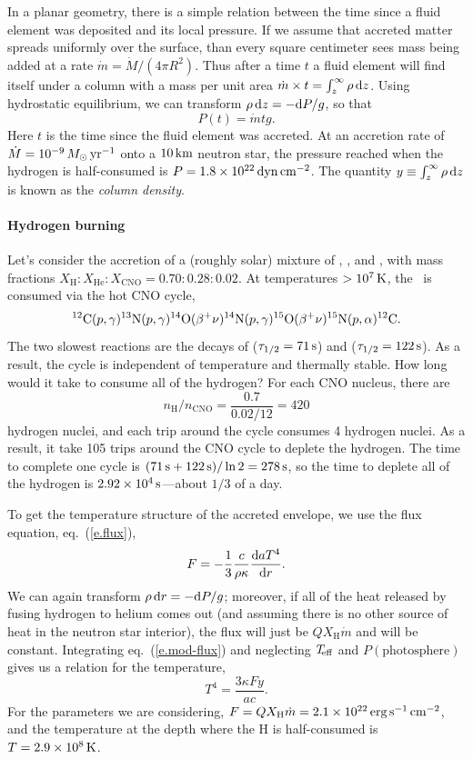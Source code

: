 In a planar geometry, there is a simple relation between the time since a fluid element was deposited and its local pressure. If we assume that accreted matter spreads uniformly over the surface, than every square centimeter sees mass being added at a rate $\dot{m} = \dot{M}/(4\pi R^{2})$.  Thus after a time $t$ a fluid element will find itself under a column with a mass per unit area $\dot{m}\times t = \int_{z}^{\infty}\rho\usp\dif z$. Using hydrostatic equilibrium, we can transform $\rho\usp\dif z = -\dif P/g$, so that
\[
P(t) = \dot{m}tg.
\]
Here $t$ is the time since the fluid element was accreted.  At an accretion rate of $\dot{M} = 10^{-9}\nsp\Msun\usp\yr^{-1}$ onto a $10\nsp\km$ neutron star, the pressure reached when the hydrogen is half-consumed is $P = 1.8\ee{22}\nsp\dyne\usp\cm^{-2}$.  The quantity $y\equiv \int_{z}^{\infty}\rho\usp\dif z$ is known as the \emph{column density}.

\paragraph{Hydrogen burning}
Let's consider the accretion of a (roughly solar) mixture of \hydrogen, \helium, and \carbon, with mass fractions $X_{\mathrm{H}}:X_{\mathrm{He}}:X_{\mathrm{CNO}} = 0.70:0.28:0.02$. At temperatures $> 10^{7}\nsp\K$, the \hydrogen\ is consumed via the hot CNO cycle,
\[
	\carbon(\pt,\gamma)\nitrogen[13](\pt,\gamma)\oxygen[14](\beta^{+}\nu)\nitrogen[14](\pt,\gamma) \oxygen[15](\beta^{+}\nu)\nitrogen[15](\pt,\alpha)\carbon.
\]
The two slowest  reactions are the decays of \oxygen[14] ($\tau_{1/2} = 71\nsp\second$) and \oxygen[15] ($\tau_{1/2} = 122\nsp\second$). As a result, the cycle is independent of temperature and thermally stable.
How long would it take to consume all of the hydrogen?  For each CNO nucleus, there are
\[ n_{\mathrm{H}}/n_{\mathrm{CNO}} = \frac{0.7}{0.02/12} = 420 \]
hydrogen nuclei, and each trip around the cycle consumes 4 hydrogen nuclei. As a result, it take 105 trips around the CNO cycle to deplete the hydrogen.  The time to complete one cycle is $(71\nsp\second + 122\nsp\second) /\ln 2 = 278\nsp\second$, so the time to deplete all of the hydrogen is $2.92\ee{4}\nsp\second$---about $1/3$ of a day.

To get the temperature structure of the accreted envelope, we use the flux equation, eq.~(\ref{e.flux}),
\begin{equation}\label{e.mod-flux}
F = -\frac{1}{3}\frac{c}{\rho\kappa}\frac{\dif aT^{4}}{\dif r}.
\end{equation}
We can again transform $\rho\usp\dif r = -\dif P/g$; moreover, if all of the heat released by fusing hydrogen to helium comes out (and assuming there is no other source of heat in the neutron star interior), the flux will just be $QX_{\mathrm{H}}\dot{m}$ and will be constant. Integrating eq.~(\ref{e.mod-flux}) and neglecting $\Teff$ and $P(\textrm{photosphere})$ gives us a relation for the temperature,
\[	T^{4} = \frac{3\kappa Fy}{ac}. \]
For the parameters we are considering, $F = QX_{\mathrm{H}}\dot{m} = 2.1\ee{22}\nsp\ergspersecond\usp\cm^{-2}$, and the temperature at the depth where the H is half-consumed is $T = 2.9\ee{8}\nsp\K$.

